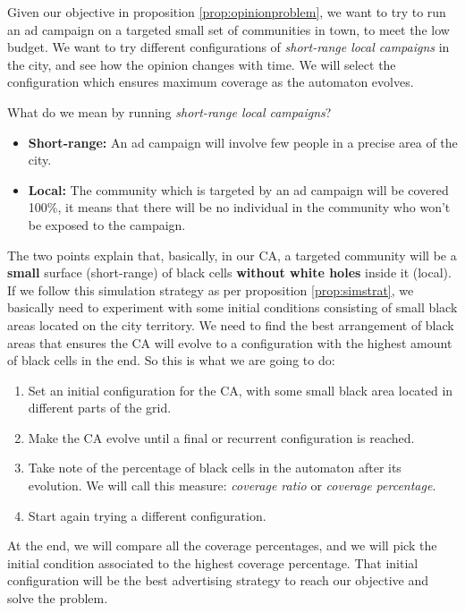 \begin{proposition}
\label{prop:simstrat}
Given our objective in proposition \ref{prop:opinionproblem}, we want to try to run an ad
campaign on a targeted small set of communities in town, to meet the low budget. We want to try
different configurations of \textit{short-range local campaigns} in the city,
and see how the opinion changes with time. We will select the configuration which ensures
maximum coverage as the automaton evolves.
\end{proposition}

What do we mean by running \textit{short-range local campaigns}?

\begin{itemize}
\item \textbf{Short-range:} An ad campaign will involve few people in a precise area of the city.
\item \textbf{Local:} The community which is targeted by an ad campaign will be covered 100\%, it
means that there will be no individual in the community who won't be exposed to the campaign.
\end{itemize}

The two points explain that, basically, in our CA,
a targeted community will be a \textbf{small} surface (short-range) of black cells
\textbf{without white holes} inside it (local). If we follow this simulation strategy as per proposition
\ref{prop:simstrat}, we basically need to experiment with some initial conditions consisting of small
black areas located on the city territory. We need to find the best arrangement of black areas that
ensures the CA will evolve to a configuration with the highest amount of black cells in the end.
So this is what we are going to do:

\begin{enumerate}
\item Set an initial configuration for the CA, with some small black area located in
different parts of the grid.
\item Make the CA evolve until a final or recurrent configuration is reached.
\item Take note of the percentage of black cells in the automaton after its evolution. We will call this
measure: \textit{coverage ratio} or \textit{coverage percentage}.
\item Start again trying a different configuration.
\end{enumerate}

At the end, we will compare all the coverage percentages, and we will pick the initial condition
associated to the highest coverage percentage. That initial configuration will be the best
advertising strategy to reach our objective and solve the problem.

